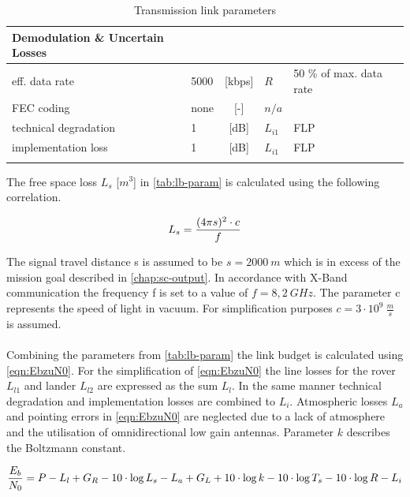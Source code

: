 \begin{table}[h]
\begin{tabular}{llclll}
Demodulation \& Uncertain Losses &        &            &               &                              &  \\ \hline\hline
eff. data rate                   & 5000   & {[}kbps{]} & ${R}$         & 50 \% of max. data rate                            &  \\
FEC coding                       & none   & {[}-{]}    & ${n/a}$       &                              &  \\
technical degradation            & 1      & {[}dB{]}   & ${L}_{i1}$    & FLP                          &  \\
implementation loss              & 1      & {[}dB{]}   & ${L}_{i1}$	   & FLP                          &  \\
                                 &        &            &               &                              & 
\end{tabular}
\caption{Transmission link parameters}
\label{tab:lb-param}
\end{table}

The free space loss ${L}_{s}$ [$m^3$] in \autoref{tab:lb-param} is calculated using the following correlation. 

\begin{equation}
	\centering
		{L}_{s} = {\frac{(4 \pi s)^2 \cdot c}{f}}
	\label{eqn:Ls}
\end{equation}

The signal travel distance {s} is assumed to be $s = 2000\ m$ which is in excess of the mission goal described in \autoref{chap:sc-output}. In accordance with X-Band communication the frequency {f} is set to a value of $f = 8,2\ GHz$. The parameter c represents the speed of light in vacuum. For simplification purposes $c = 3 \cdot 10^9\ \frac{m}{s}$ is assumed. \\ \\   
Combining the parameters from \autoref{tab:lb-param} the link budget is calculated using \autoref{eqn:EbzuN0}. For the simplification of \autoref{eqn:EbzuN0} the line losses for the rover ${L}_{l1}$ and lander ${L}_{l2}$ are expressed as the sum ${L}_{l}$. In the same manner technical degradation and implementation losses are combined to ${L}_{i}$. Atmospheric losses ${L}_{a}$ and pointing errors in \autoref{eqn:EbzuN0} are neglected due to a lack of atmosphere and the utilisation of omnidirectional low gain antennas. Parameter ${k}$ describes the Boltzmann constant.   

\begin{equation}
  \centering
		{\frac{{E}_{b}}{{N}_{0}}} = {P} - {L}_{l} + {G}_{R} - {10\cdot \log{{L}_{s}}} - {L}_{a} + {G}_{L} + {10\cdot \log{k}} - {10\cdot \log{{T}_{s}}} - {10\cdot \log{{R}}} - {L}_{i}
	\label{eqn:EbzuN0}
\end{equation}



